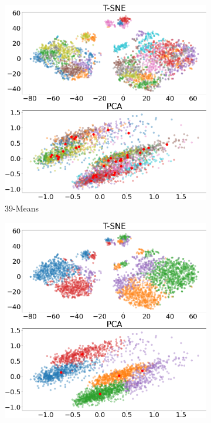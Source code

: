 \documentclass[11pt,twocolumn,letterpaper]{article}
\begin{document}
\begin{figure}
\begin{subfigure}[b]{0.23\textwidth}
         \includegraphics[width=\textwidth]{assests/39-means.png}
         \caption{39-Means}
         \label{fig:cluster:39means}
     \end{subfigure}
     \hfill
     \begin{subfigure}[b]{0.23\textwidth}
         \centering
         \includegraphics[width=\textwidth]{assests/5-means.png}

\end{subfigure}
\end{figure}
\end{document}
